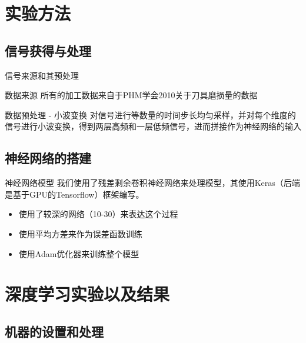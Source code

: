 \documentclass[12pt,aspectratio=169]{beamer}
\begin{document}
	\section{实验方法}
	\subsection{信号获得与处理}
	\begin{frame}{信号来源和其预处理}
		\begin{block}{数据来源}
			所有的加工数据来自于PHM学会2010关于刀具磨损量的数据\cite{phm2010}
		\end{block}
		
		\begin{block}{数据预处理 - 小波变换}
			对信号进行等数量的时间步长均匀采样，并对每个维度的信号进行小波变换，得到两层高频和一层低频信号，进而拼接作为神经网络的输入
		\end{block}
		
		
		
		
	\end{frame}
	
	\subsection{神经网络的搭建}
	
	\begin{frame}{神经网络模型}
		我们使用了残差剩余卷积神经网络来处理模型，其使用Keras（后端是基于GPU的Tensorflow）框架编写。
		
		\begin{itemize}
			\item 使用了较深的网络（10-30）来表达这个过程
			\item 使用平均方差来作为误差函数训练
			\item 使用Adam优化器来训练整个模型
		\end{itemize}
		
	\end{frame}
	
	\section{深度学习实验以及结果}
	
	\subsection{机器的设置和处理}
	
\end{document}
